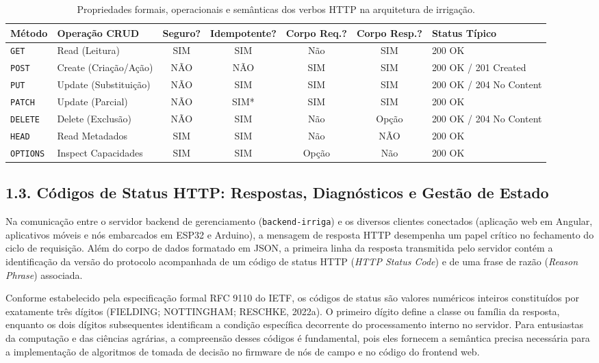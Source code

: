 \begin{table}[h!]
\centering
\fontsize{9}{11}\selectfont
\caption{Propriedades formais, operacionais e semânticas dos verbos HTTP na arquitetura de irrigação.}
\begin{tabular}{|l|l|c|c|c|c|l|}
\hline
\textbf{Método} & \textbf{Operação CRUD} & \textbf{Seguro?} & \textbf{Idempotente?} & \textbf{Corpo Req.?} & \textbf{Corpo Resp.?} & \textbf{Status Típico} \\ \hline
\texttt{GET} & Read (Leitura) & SIM & SIM & Não & SIM & 200 OK \\ \hline
\texttt{POST} & Create (Criação/Ação) & NÃO & NÃO & SIM & SIM & 200 OK / 201 Created \\ \hline
\texttt{PUT} & Update (Substituição) & NÃO & SIM & SIM & SIM & 200 OK / 204 No Content \\ \hline
\texttt{PATCH} & Update (Parcial) & NÃO & SIM* & SIM & SIM & 200 OK \\ \hline
\texttt{DELETE} & Delete (Exclusão) & NÃO & SIM & Não & Opção & 200 OK / 204 No Content \\ \hline
\texttt{HEAD} & Read Metadados & SIM & SIM & Não & NÃO & 200 OK \\ \hline
\texttt{OPTIONS} & Inspect Capacidades & SIM & SIM & Opção & Não & 200 OK \\ \hline
\end{tabular}
\end{table}

\subsection*{1.3. Códigos de Status HTTP: Respostas, Diagnósticos e Gestão de Estado}

Na comunicação entre o servidor backend de gerenciamento (\texttt{backend-irriga}) e os diversos clientes conectados (aplicação web em Angular, aplicativos móveis e nós embarcados em ESP32 e Arduino), a mensagem de resposta HTTP desempenha um papel crítico no fechamento do ciclo de requisição. Além do corpo de dados formatado em JSON, a primeira linha da resposta transmitida pelo servidor contém a identificação da versão do protocolo acompanhada de um código de status HTTP (\textit{HTTP Status Code}) e de uma frase de razão (\textit{Reason Phrase}) associada.

Conforme estabelecido pela especificação formal RFC 9110 do IETF, os códigos de status são valores numéricos inteiros constituídos por exatamente três dígitos (FIELDING; NOTTINGHAM; RESCHKE, 2022a). O primeiro dígito define a classe ou família da resposta, enquanto os dois dígitos subsequentes identificam a condição específica decorrente do processamento interno no servidor. Para entusiastas da computação e das ciências agrárias, a compreensão desses códigos é fundamental, pois eles fornecem a semântica precisa necessária para a implementação de algoritmos de tomada de decisão no firmware de nós de campo e no código do frontend web.

